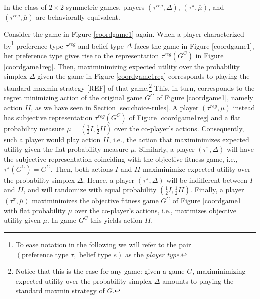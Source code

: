 \documentclass[fleqn,reqno,11pt]{article}
\begin{document}
\begin{fact} \label{fact:equivalence2x2}
In the class of $2 \times 2$ symmetric games, players $(\tau^{reg}, \Delta)$, $(\tau^{\pi}, \overline{\mu})$, and $(\tau^{reg},\overline{\mu})$ are behaviorally equivalent.
\end{fact} 




\begin{example}
  Consider the game in Figure \ref{coordgame1} again. When a player characterized
  by\footnote{To ease notation in the following we will refer to the pair
    $(\text{preference type } \tau,\text{ belief type } e)$ as the \textit{player type}.} preference
  type $ \tau^{reg} $ and belief type $ \Delta $ faces the game in Figure
  \ref{coordgame1}, her preference type gives rise to the representation $\tau^{reg}(G^C)$ in
  Figure \ref{coordgame1reg}. Then, maximinimizing expected utility over the probability
  simplex $ \Delta $ given the game in Figure \ref{coordgame1reg} corresponds to
  playing the standard maxmin strategy [REF] of that game.\footnote{Notice that this is the
    case for any game: given a game $G$, maximinimizing expected utility over the probability
    simplex $ \Delta $ amounts to playing the standard maxmin strategy of $G$.} This,
  in turn, corresponds to the regret minimizing action of the original game $G^C$ of Figure
  \ref{coordgame1}, namely action $II$, as we have seen in Section \ref{sec:choice-rules}. A
  player $(\tau^{reg},\overline{\mu})$ instead has subjective representation $\tau^{reg}(G^C)$
  of Figure \ref{coordgame1reg} and a flat probability measure
  $\overline{\mu}=(\frac{1}{2}I,\frac{1}{2}II)$ over the co-player's actions. Consequently,
  such a player would play action $II$, i.e., the action that maximinimizes expected utility
  given the flat probability measure $\overline{\mu}$. Similarly, a player
  $(\tau^{\pi},\Delta)$ will have the subjective representation coinciding with the
  objective fitness game, i.e., $ \tau^{\pi}(G^C)= G^C $. Then, both actions $I$ and $II$
  maximinimize expected utility over the probability simplex $ \Delta $. Hence, a
  player $(\tau^{\pi},\Delta)$ will be indifferent between $I$ and $II$, and will
  randomize with equal probability $(\frac{1}{2}I,\frac{1}{2}II)$. Finally, a player
  $(\tau^{\pi},\overline{\mu})$ maximinimizes the objective fitness game $G^C$ of Figure
  \ref{coordgame1} with flat probability $\overline{\mu}$ over the co-player's actions, i.e.,
  maximizes objective utility given $\overline{\mu}$. In game $G^C$ this yields action $II$.

\end{example}
\end{document}
